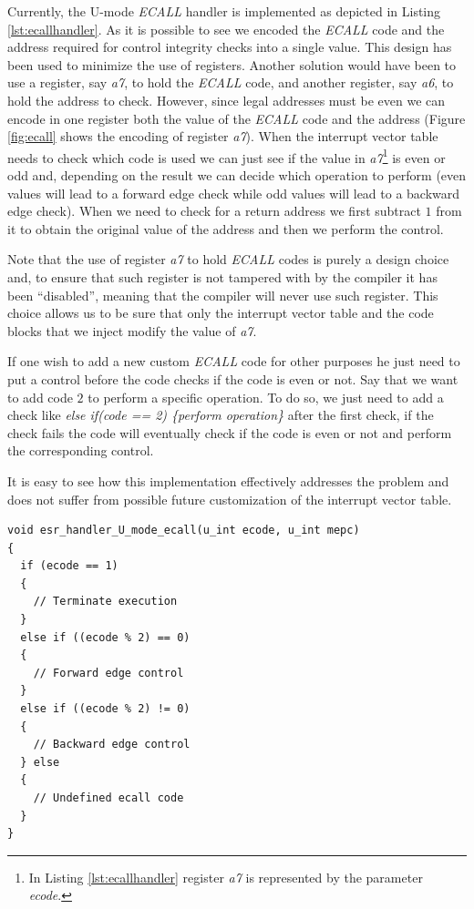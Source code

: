 Currently, the U-mode \textit{ECALL} handler is implemented as depicted in
Listing \ref{lst:ecallhandler}. As it is possible to see we encoded the \textit{ECALL}
code and the address required for control integrity checks into a single value. This
design has been used to minimize the use of registers. Another solution would
have been to use a register, say \textit{a7}, to hold the \textit{ECALL} code, and
another register, say \textit{a6}, to hold the address to check. However, since
legal addresses must be even we can encode in one register both the value of the
\textit{ECALL} code and the address (Figure \ref{fig:ecall} shows the encoding
of register \textit{a7}). When the interrupt vector table needs to check which code
is used we can just see if the value in \textit{a7}\footnote{In Listing
\ref{lst:ecallhandler} register \textit{a7} is represented by the parameter \textit{ecode}.}
is even or odd and, depending on the result we can decide which operation to
perform (even values will lead to a forward edge check while odd values will lead
to a backward edge check). When we need to check for a return address we first subtract
$1$ from it to obtain the original value of the address and then we perform the control.

Note that the use of register \textit{a7} to hold \textit{ECALL} codes is purely
a design choice and, to ensure that such register is not tampered with by the
compiler it has been ``disabled'', meaning that the compiler will never use such
register. This choice allows us to be sure that only the interrupt vector table
and the code blocks that we inject modify the value of \textit{a7}.

If one wish to add a new custom \textit{ECALL} code for other purposes he just
need to put a control before the code checks if the code is even or not. Say that
we want to add code $2$ to perform a specific operation. To do so, we just need to
add a check like \textit{else if(code == 2) \{perform operation\}} after the
first check, if the check fails the code will eventually check if the code is even
or not and perform the corresponding control.

It is easy to see how this implementation effectively addresses the problem and does
not suffer from possible future customization of the interrupt vector table.

\begin{lstlisting}[style=CStyle, caption = U-mode \textit{ECALL} handler, label={lst:ecallhandler}]
void esr_handler_U_mode_ecall(u_int ecode, u_int mepc)
{
  if (ecode == 1)
  {
    // Terminate execution
  }
  else if ((ecode % 2) == 0)
  {
    // Forward edge control
  }
  else if ((ecode % 2) != 0)
  {
    // Backward edge control
  } else
  {
    // Undefined ecall code
  }
}
\end{lstlisting}

